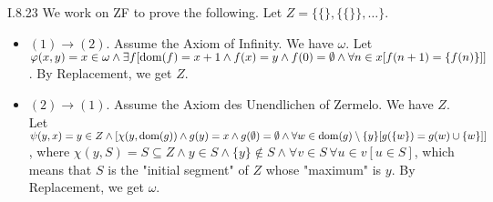 \documentclass[12pt]{article}
\begin{document}
\begin{customthm}{I.8.23}
  We work on ZF to prove the following. Let $Z=\{\{\},\{\{\}\},\ldots\}$.
  \begin{itemize}
    \item\underline{$(1)\rightarrow(2)$}. Assume the Axiom of Infinity. We have $\omega$. Let $\varphi(x,y)=x\in\omega\wedge\exists f[\mathop{\mathrm{dom}}(f)=x+1\wedge f(x)=y\wedge f(0)=\emptyset\wedge\forall n\in x[f(n+1)=\{f(n)\}]]$. By Replacement, we get $Z$.
    \item\underline{$(2)\rightarrow(1)$}. Assume the Axiom des Unendlichen of Zermelo. We have $Z$. Let $\psi(y,x)=y\in Z\wedge[\chi(y,\mathop{\mathrm{dom}}(g))\wedge g(y)=x\wedge g(\emptyset)=\emptyset\wedge\forall w\in\mathop{\mathrm{dom}}(g)\setminus\{y\}[g(\{w\})=g(w)\cup\{w\}]]$, where $\chi(y, S)=S\subseteq Z\wedge y\in S\wedge\{y\}\not\in S\wedge\forall v\in S\,\forall u\in v[u\in S]$, which means that $S$ is the "initial segment" of $Z$ whose "maximum" is $y$. By Replacement, we get $\omega$.
  \end{itemize}
\end{customthm}
\end{document}
